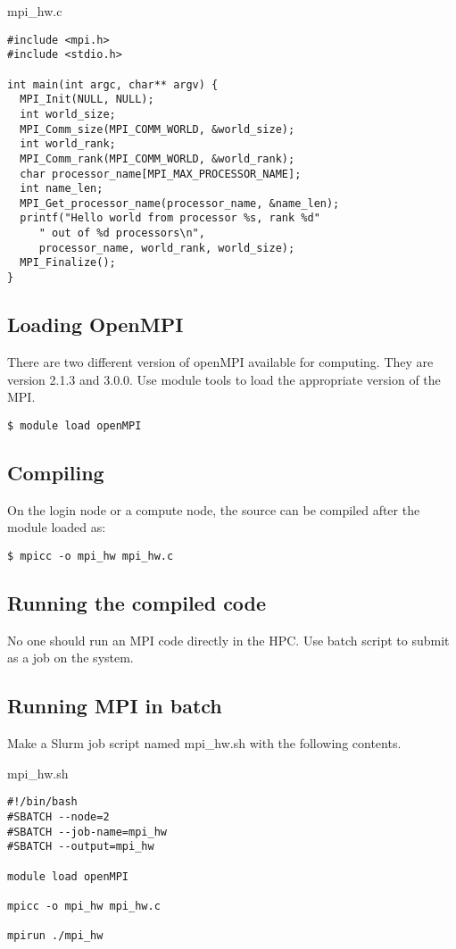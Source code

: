 \documentclass[11pt]{article}
\numberwithin{figure}{section}
\begin{document}
mpi\_hw.c

\begin{lstlisting}[frame=single]
#include <mpi.h>
#include <stdio.h>
 
int main(int argc, char** argv) {
  MPI_Init(NULL, NULL);
  int world_size;
  MPI_Comm_size(MPI_COMM_WORLD, &world_size);
  int world_rank;
  MPI_Comm_rank(MPI_COMM_WORLD, &world_rank);
  char processor_name[MPI_MAX_PROCESSOR_NAME];
  int name_len;
  MPI_Get_processor_name(processor_name, &name_len);
  printf("Hello world from processor %s, rank %d"
     " out of %d processors\n",
     processor_name, world_rank, world_size);
  MPI_Finalize();
}
\end{lstlisting}

\subsection{Loading OpenMPI}
There are two different version of openMPI available for computing. They are
version 2.1.3 and 3.0.0. Use module tools to load the appropriate version of
the MPI.

\begin{lstlisting}[frame=single]
$ module load openMPI
\end{lstlisting}

\subsection{Compiling}
On the login node or a compute node, the source can be compiled after the
module loaded as:

\begin{lstlisting}[frame=single]
$ mpicc -o mpi_hw mpi_hw.c
\end{lstlisting}

\subsection{Running the compiled code}
No one should run an MPI code directly in the HPC. Use batch script to submit
as a job on the system.

\subsection{Running MPI in batch}
Make a Slurm job script named mpi\_hw.sh with the following contents.

mpi\_hw.sh

\begin{lstlisting}[frame=single]
#!/bin/bash
#SBATCH --node=2
#SBATCH --job-name=mpi_hw
#SBATCH --output=mpi_hw

module load openMPI

mpicc -o mpi_hw mpi_hw.c

mpirun ./mpi_hw
\end{lstlisting}
\end{document}

